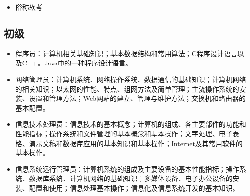 
\begin{issues}
\issueDraft
\end{issues}

\begin{itemize}
\item 俗称软考
\end{itemize}


\subsection{初级}
\begin{itemize}
\item 程序员：计算机相关基础知识；基本数据结构和常用算法；C程序设计语言以及C++。Java中的一种程序设计语言。
\item 网络管理员：计算机系统、网络操作系统、数据通信的基础知识；计算机网络的相关知识；以太网的性能、特点、组网方法及简单管理；主流操作系统的安装、设置和管理方法；Web网站的建立、管理与维护方法；交换机和路由器的基本配置。
\item 信息技术处理员：信息技术的基本概念；计算机的组成、各主要部件的功能和性能指标；操作系统和文件管理的基本概念和基本操作；文字处理、电子表格、演示文稿和数据库应用的基本知识和基本操作；Internet及其常用软件的基本操作。
\item 信息系统远行管理员：计算机系统的组成及主要设备的基本性能指标；操作系统、数据库系统、计算机网络的基础知识；多媒体设备、电子办公设备的安装、配置和使用；信息处理基本操作；信息化及信息系统开发的基本知识。
\end{itemize}

